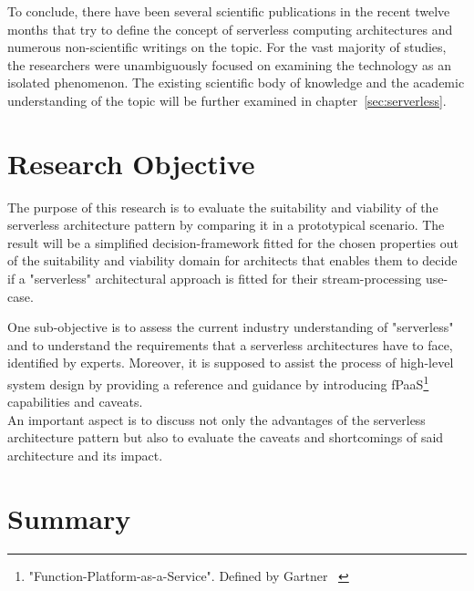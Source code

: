 To conclude, there have been several scientific publications in the recent twelve months that try to define the concept of serverless computing architectures and numerous non-scientific writings on the topic. For the vast majority of studies, the researchers were unambiguously focused on examining the technology as an isolated phenomenon. The existing scientific body of knowledge and the academic understanding of the topic will be further examined in chapter~\vref{sec:serverless}.

\section{Research Objective}\label{chp:objective}

The purpose of this research is to evaluate the suitability and viability of the serverless architecture pattern by comparing it in a prototypical scenario. The result will be a simplified decision-framework fitted for the chosen properties out of the suitability and viability domain for architects that enables them to decide if a "serverless" architectural approach is fitted for their stream-processing use-case.

One sub-objective is to assess the current industry understanding of "serverless" and to understand the requirements that a serverless architectures have to face, identified by experts.
Moreover, it is supposed to assist the process of high-level system design by providing a reference and guidance by introducing fPaaS\footnote{"Function-Platform-as-a-Service". Defined by Gartner ~} capabilities and caveats.\\
An important aspect is to discuss not only the advantages of the serverless architecture pattern but also to evaluate the caveats and shortcomings of said architecture and its impact. 

\section{Summary}\label{chp:motivationEND}

